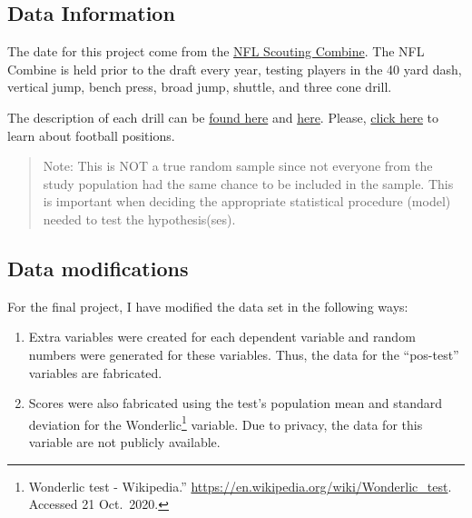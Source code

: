 \documentclass[
]{article}
\begin{document}
\hypertarget{data-info}{%
\subsection{Data Information}\label{data-info}}

The date for this project come from the \href{https://en.wikipedia.org/wiki/NFL_Scouting_Combine}{NFL Scouting Combine}. The NFL Combine is held prior to the draft every year, testing players in the 40 yard dash, vertical jump, bench press, broad jump, shuttle, and three cone drill.

The description of each drill can be \href{https://nflcombineresults.com/nfl-combine-drills-101-what-each-drill-measures/}{found here} and \href{https://www.espn.com/nfl/draft2018/story/_/id/22587931/guide-nfl-draft-combine-drills-todd-mcshay-numbers-know-40-yard-dash-short-shuttle-bench-press}{here}. Please, \href{https://protips.dickssportinggoods.com/sports-and-activities/football/football-101-football-positions-and-their-roles}{click here} to learn about football positions.

\begin{quote}
Note: This is NOT a true random sample since not everyone from the study population had the same chance to be included in the sample. This is important when deciding the appropriate statistical procedure (model) needed to test the hypothesis(ses).
\end{quote}

\hypertarget{data-modifications}{%
\subsection{Data modifications}\label{data-modifications}}

For the final project, I have modified the data set in the following ways:

\begin{enumerate}
\def\labelenumi{\arabic{enumi}.}
\item
  Extra variables were created for each dependent variable and random numbers were generated for these variables. Thus, the data for the ``pos-test'' variables are fabricated.
\item
  Scores were also fabricated using the test's population mean and standard deviation for the Wonderlic\footnote{Wonderlic test - Wikipedia.'' \url{https://en.wikipedia.org/wiki/Wonderlic_test}. Accessed 21 Oct.~2020.} variable. Due to privacy, the data for this variable are not publicly available.
\end{enumerate}
\end{document}

